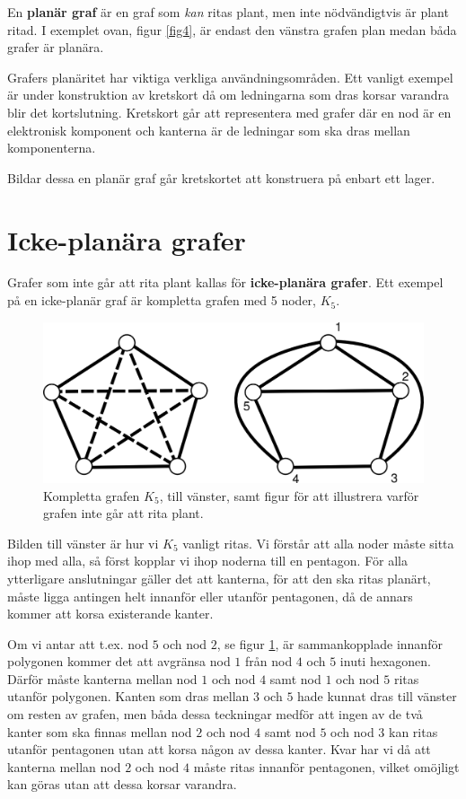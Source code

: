 \documentclass[a4paper,11pt]{article}
\begin{document}
En \textbf{planär graf} är en graf som \emph{kan} ritas plant, men inte nödvändigtvis är plant ritad. I exemplet ovan, figur \ref{fig4}, är endast den vänstra grafen plan medan båda grafer är planära.

Grafers planäritet har viktiga verkliga användningsområden. Ett vanligt exempel är under konstruktion av kretskort då om ledningarna som dras korsar varandra blir det kortslutning. Kretskort går att representera med grafer där en nod är en elektronisk komponent och kanterna är de ledningar som ska dras mellan komponenterna.

Bildar dessa en planär graf går kretskortet att konstruera på enbart ett lager.

\section*{Icke-planära grafer}

Grafer som inte går att rita plant kallas för \textbf{icke-planära grafer}. Ett exempel på en icke-planär graf är kompletta grafen med 5 noder, $K_5$.

\begin{figure}[!ht]
	\begin{center}
		\includegraphics{fig5}
		\caption{Kompletta grafen $K_5$, till vänster, samt figur för att illustrera varför grafen inte går att rita plant.}
		\label{fig5}
	\end{center}
\end{figure}
\FloatBarrier

Bilden till vänster är hur vi $K_5$ vanligt ritas.
Vi förstår att alla noder måste sitta ihop med alla, så först kopplar vi ihop noderna till en pentagon.
För alla ytterligare anslutningar gäller det att kanterna, för att den ska ritas planärt, måste ligga antingen helt innanför eller utanför pentagonen, då de annars kommer att korsa existerande kanter.

Om vi antar att t.ex. nod $5$ och nod $2$, se figur \ref{fig5}, är sammankopplade innanför polygonen kommer det att avgränsa nod $1$ från nod $4$ och $5$ inuti hexagonen.
Därför måste kanterna mellan nod $1$ och nod $4$ samt nod $1$ och nod $5$ ritas utanför polygonen.
Kanten som dras mellan $3$ och $5$ hade kunnat dras till vänster om resten av grafen, men båda dessa teckningar medför att ingen av de två kanter som ska finnas mellan nod $2$ och nod $4$ samt nod $5$ och nod $3$ kan ritas utanför pentagonen utan att korsa någon av dessa kanter.
Kvar har vi då att kanterna mellan nod $2$ och nod $4$ måste ritas innanför pentagonen, vilket omöjligt kan göras utan att dessa korsar varandra.
\end{document}
